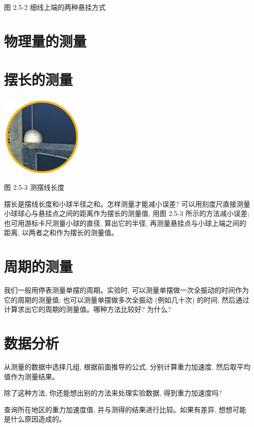 \documentclass[10pt]{article}
\begin{document}
图 2.5-2 细线上端的两种悬挂方式

\section*{物理量的测量}

\section*{摆长的测量}

\begin{center}
\includegraphics[max width=0.3\textwidth]{images/01910e4c-ebb8-7d2c-8f2f-2375bc1d2d12_57_826887.jpg}
\end{center}

图 2.5-3 测摆线长度

摆长是摆线长度和小球半径之和。怎样测量才能减小误差? 可以用刻度尺直接测量小球球心与悬挂点之间的距离作为摆长的测量值, 用图 2.5-3 所示的方法减小误差; 也可用游标卡尺测量小球的直径, 算出它的半径, 再测量悬挂点与小球上端之间的距离, 以两者之和作为摆长的测量值。

\section*{周期的测量}

我们一般用停表测量单摆的周期。实验时, 可以测量单摆做一次全振动的时间作为它的周期的测量值; 也可以测量单摆做多次全振动 (例如几十次) 的时间, 然后通过计算求出它的周期的测量值。哪种方法比较好? 为什么?

\section*{数据分析}

从测量的数据中选择几组, 根据前面推导的公式, 分别计算重力加速度, 然后取平均值作为测量结果。

除了这种方法, 你还能想出别的方法来处理实验数据, 得到重力加速度吗?

查询所在地区的重力加速度值, 并与测得的结果进行比较。如果有差异, 想想可能是什么原因造成的。
\end{document}
